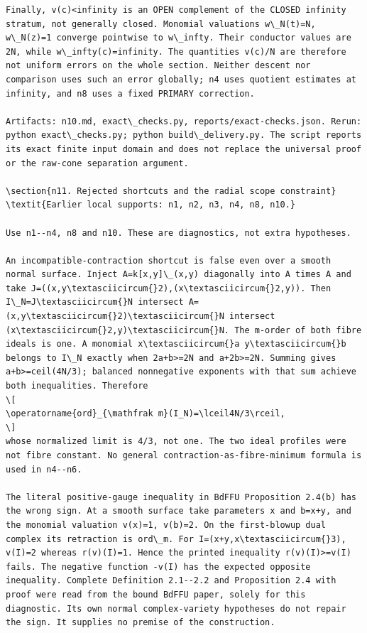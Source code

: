 \documentclass[
]{article}
\begin{document}
\begin{verbatim}
Finally, v(c)<infinity is an OPEN complement of the CLOSED infinity stratum, not generally closed. Monomial valuations w\_N(t)=N, w\_N(z)=1 converge pointwise to w\_infty. Their conductor values are 2N, while w\_infty(c)=infinity. The quantities v(c)/N are therefore not uniform errors on the whole section. Neither descent nor comparison uses such an error globally; n4 uses quotient estimates at infinity, and n8 uses a fixed PRIMARY correction.

Artifacts: n10.md, exact\_checks.py, reports/exact-checks.json. Rerun: python exact\_checks.py; python build\_delivery.py. The script reports its exact finite input domain and does not replace the universal proof or the raw-cone separation argument.

\section{n11. Rejected shortcuts and the radial scope constraint}
\textit{Earlier local supports: n1, n2, n3, n4, n8, n10.}

Use n1--n4, n8 and n10. These are diagnostics, not extra hypotheses.

An incompatible-contraction shortcut is false even over a smooth normal surface. Inject A=k[x,y]\_(x,y) diagonally into A times A and take J=((x,y\textasciicircum{}2),(x\textasciicircum{}2,y)). Then I\_N=J\textasciicircum{}N intersect A=(x,y\textasciicircum{}2)\textasciicircum{}N intersect (x\textasciicircum{}2,y)\textasciicircum{}N. The m-order of both fibre ideals is one. A monomial x\textasciicircum{}a y\textasciicircum{}b belongs to I\_N exactly when 2a+b>=2N and a+2b>=2N. Summing gives a+b>=ceil(4N/3); balanced nonnegative exponents with that sum achieve both inequalities. Therefore
\[
\operatorname{ord}_{\mathfrak m}(I_N)=\lceil4N/3\rceil,
\]
whose normalized limit is 4/3, not one. The two ideal profiles were not fibre constant. No general contraction-as-fibre-minimum formula is used in n4--n6.

The literal positive-gauge inequality in BdFFU Proposition 2.4(b) has the wrong sign. At a smooth surface take parameters x and b=x+y, and the monomial valuation v(x)=1, v(b)=2. On the first-blowup dual complex its retraction is ord\_m. For I=(x+y,x\textasciicircum{}3), v(I)=2 whereas r(v)(I)=1. Hence the printed inequality r(v)(I)>=v(I) fails. The negative function -v(I) has the expected opposite inequality. Complete Definition 2.1--2.2 and Proposition 2.4 with proof were read from the bound BdFFU paper, solely for this diagnostic. Its own normal complex-variety hypotheses do not repair the sign. It supplies no premise of the construction.


\end{verbatim}
\end{document}
